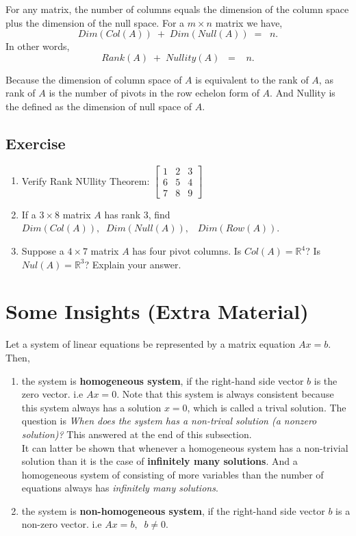 \documentclass[aima104_lecturenotes_ku.tex]{subfiles}
\begin{document}
\begin{mdframed}
\begin{theorem}
For any matrix, the number of columns equals the dimension of the column space plus the dimension of the null space. For a $m \times n$ matrix we have, $$ Dim(Col(A))\; + \; Dim(Null(A)) \; = \;\;n. $$
In other words,
$$Rank(A) \; +\; Nullity(A)\;\; = \;\;\; n.$$
\end{theorem}
\end{mdframed}
Because the dimension of column space of \(A\) is equivalent to the rank of \(A\), as rank of \(A\) is the number of pivots in the row echelon form of \(A\). And Nullity is the defined as the dimension of null space of \(A\).

\subsection{Exercise}
\begin{enumerate}

\item Verify Rank NUllity Theorem:
$\displaystyle \begin{bmatrix}
    1 & 2 & 3 \\
    6 & 5 &4 \\
    7 & 8 & 9
\end{bmatrix}$

\item If a $3 \times 8$ matrix $A$ has rank $3$, find $ Dim(Col(A)),\;\; Dim(Null(A)), \;\;\; Dim(Row(A))$.

\item Suppose a $4 \times 7$ matrix $A$ has four pivot columns. Is $Col(A) = \mathbb{R}^4$? Is $Nul(A) = \mathbb{R}^3$? Explain your answer.

\end{enumerate}

\section{Some Insights (Extra Material)}
Let a system of linear equations be represented by a matrix equation \(Ax=b\). Then,
\begin{enumerate}
\item the system is \textbf{homogeneous system}, if the right-hand side vector \(b\) is the zero vector. i.e \(Ax=0\). Note that this system is always consistent because this system always has a solution \(x=0\), which is called a trival solution. The question is \textit{When does the system has a non-trival solution (a nonzero solution)?} This answered at the end of this subsection. \\
  It can latter be shown that whenever a homogeneous system has a non-trivial solution than it is the case of \textbf{infinitely many solutions}. And a homogeneous system of consisting of more variables than the number of equations always has \textit{infinitely many solutions}.

 \item the system is \textbf{non-homogeneous system}, if the right-hand side vector \(b\) is a non-zero vector. i.e \(Ax=b, \;\; b \neq 0\).
 \end{enumerate}
\end{document}
